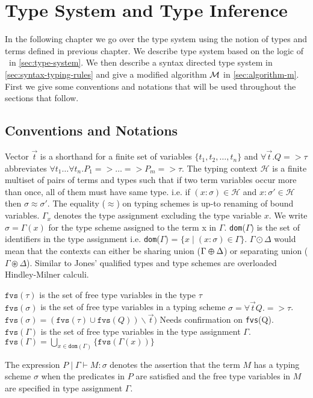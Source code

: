 \chapter{Type System and Type Inference}
In the following chapter we go over the type system using the notion of types and terms defined in previous
chapter. We describe type system based on the logic of \BI\ in \cref{sec:type-system}. We then describe a
syntax directed type system in \cref{sec:syntax-typing-rules} and give a modified algorithm $\mathcal{M}$ in \cref{sec:algorithm-m}.
First we give some conventions and notations that will be used throughout the sections that follow.

\section{Conventions and Notations}
Vector $\vec{t}$ is a shorthand for a finite set of variables $\{t_1, t_2, \dots, t_n\}$ and $\forall \vec{t}. Q => \tau$
abbreviates $\forall t_1 \dots \forall t_n. P_1 => \dots => P_m => \tau$.
The typing context $\mathcal{H}$ is a finite multiset of pairs of terms and types such that if two term variables occur
more than once, all of them must have same type. i.e. if $(x:\sigma) \in \mathcal{H}$ and $x:\sigma' \in \mathcal{H}$ then $\sigma \approx \sigma'$.
The equality ($\approx$) on typing schemes is up-to renaming of bound variables.
$\Gamma_{x}$ denotes the type assignment excluding the type variable $x$.
We write $\sigma = \Gamma(x)$ for the type scheme assigned to the term x in $\Gamma$.
\texttt{dom}($\Gamma$) is the set of identifiers in the type assignment i.e.
\texttt{dom}($\Gamma$) = $\{ x \mid (x:\sigma) \in \Gamma\}$.
$\Gamma \odot \Delta$ would mean that the contexts can either
be sharing union ($\Gamma \varoplus \Delta$) or separating union ($\Gamma \circledast \Delta$).
Similar to Jones' \citeyearpar{jones_theory_1994} qualified types and type schemes are overloaded Hindley-Milner calculi.
\begin{defn}
  $\texttt{fvs}(\tau)$ is the set of free type variables in the type $\tau$\\
  $\texttt{fvs}(\sigma)$ is the set of free type variables in a typing scheme $\sigma = \forall \vec{t} Q. => \tau$.\\
  $\texttt{fvs}(\sigma) = (\texttt{fvs}(\tau) \cup \texttt{fvs}(Q)) \backslash \vec{t})${\color{red} Needs confirmation on \texttt{fvs}(Q).}\\
  $\texttt{fvs}(\Gamma)$ is the set of free type variables in the type assignment $\Gamma$.\\
  $\texttt{fvs}(\Gamma) = \bigcup_{x \in \texttt{dom}(\Gamma)} \{ \texttt{fvs}(\Gamma(x)) \}$
\end{defn}
\begin{defn}
The expression $P \mid \Gamma \vdash M : \sigma$ denotes the assertion that the term $M$ has a typing scheme $\sigma$
when the predicates in $P$ are satisfied and the free type variables in $M$ are specified in type assignment $\Gamma$.
\end{defn}


